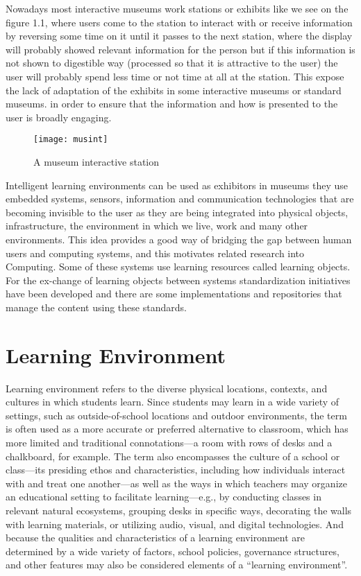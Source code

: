 Nowadays most interactive museums work stations or exhibits like we see on the figure 1.1, where users come to the station to interact with or receive information by reversing some time on it until it passes to the next station, where the display will probably showed relevant information for the person but if this information is not shown to digestible way (processed so that it is attractive to the user) the user will probably spend less time or not time at all at the station. This expose the lack of adaptation of the exhibits in some interactive museums or standard museums. in order to ensure that the information and how is presented to the user is broadly engaging. 
\begin{figure}[ht!]  
\centering  
\texttt{[image: musint]}
\quad  
\caption{A museum interactive station}  
\label{name}  
\end{figure}
Intelligent learning environments can be used as exhibitors in museums they use embedded systems, sensors, information and communication technologies that are becoming invisible to the user as they are being integrated into physical objects, infrastructure, the environment in which we live, work and many other environments. This idea provides a good way of bridging the gap between human users and computing systems, and this motivates related research into Computing. Some of these systems use learning resources called learning objects. For the ex-change of learning objects between systems standardization initiatives have been developed and there are some implementations and repositories that manage the content using these standards. 

\section{Learning Environment}
Learning environment refers to the diverse physical locations, contexts, and cultures in which students learn. Since students may learn in a wide variety of settings, such as outside-of-school locations and outdoor environments, the term is often used as a more accurate or preferred alternative to classroom, which has more limited and traditional connotations—a room with rows of desks and a chalkboard, for example.
The term also encompasses the culture of a school or class—its presiding ethos and characteristics, including how individuals interact with and treat one another—as well as the ways in which teachers may organize an educational setting to facilitate learning—e.g., by conducting classes in relevant natural ecosystems, grouping desks in specific ways, decorating the walls with learning materials, or utilizing audio, visual, and digital technologies. And because the qualities and characteristics of a learning environment are determined by a wide variety of factors, school policies, governance structures, and other features may also be considered elements of a “learning environment”.

